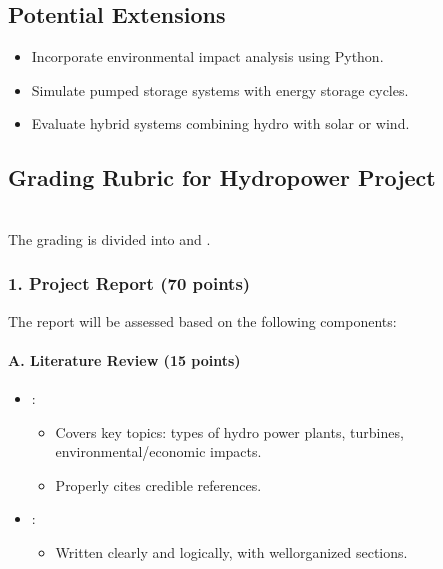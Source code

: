 \documentclass[letterpaper,10pt,english]{jupyterBook}
\begin{document}
\subsection{Potential Extensions}
\label{\detokenize{ProjectInstructions:id19}}\begin{itemize}
\item {} 
\sphinxAtStartPar
Incorporate environmental impact analysis using Python.

\item {} 
\sphinxAtStartPar
Simulate pumped storage systems with energy storage cycles.

\item {} 
\sphinxAtStartPar
Evaluate hybrid systems combining hydro with solar or wind.

\end{itemize}


\subsection{Grading Rubric for Hydropower Project}
\label{\detokenize{ProjectInstructions:grading-rubric-for-hydropower-project}}
\sphinxAtStartPar
{}\\
The grading is divided into  and .


\subsubsection{1. Project Report (70 points)}
\label{\detokenize{ProjectInstructions:id20}}
\sphinxAtStartPar
The report will be assessed based on the following components:


\paragraph{A. Literature Review (15 points)}
\label{\detokenize{ProjectInstructions:id21}}\begin{itemize}
\item {} 
\sphinxAtStartPar
{}:
\begin{itemize}
\item {} 
\sphinxAtStartPar
Covers key topics: types of hydro power plants, turbines,
environmental/economic impacts.

\item {} 
\sphinxAtStartPar
Properly cites credible references.

\end{itemize}

\item {} 
\sphinxAtStartPar
{}:
\begin{itemize}
\item {} 
\sphinxAtStartPar
Written clearly and logically, with well\sphinxhyphen{}organized sections.

\end{itemize}

\end{itemize}
\end{document}
